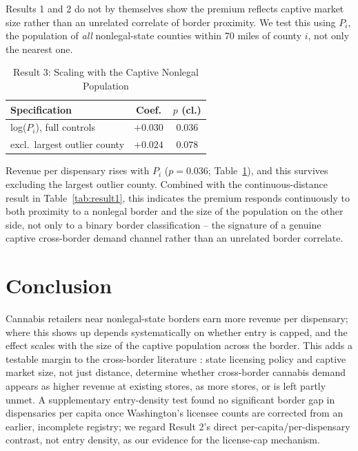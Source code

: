 \documentclass[5p]{elsarticle}
\begin{document}
Results 1 and 2 do not by themselves show the premium reflects captive market size rather than an unrelated
correlate of border proximity. We test this using $P_i$, the population of \emph{all} nonlegal-state counties
within 70 miles of county $i$, not only the nearest one.

\begin{table}[h]
\centering
\caption{Result 3: Scaling with the Captive Nonlegal Population}
\label{tab:result3}
\small
\begin{tabular}{lcc}
\toprule
Specification & Coef. & $p$ (cl.) \\
\midrule
log($P_i$), full controls & $+0.030$ & $0.036$ \\
\quad excl.\ largest outlier county & $+0.024$ & $0.078$ \\
\bottomrule
\end{tabular}
\end{table}

Revenue per dispensary rises with $P_i$ ($p=0.036$; Table~\ref{tab:result3}), and this survives excluding the
largest outlier county. Combined with the continuous-distance result in Table~\ref{tab:result1}, this
indicates the premium responds continuously to both proximity to a nonlegal border and the size of the
population on the other side, not only to a binary border classification -- the signature of a genuine
captive cross-border demand channel rather than an unrelated border correlate.

\section{Conclusion}

Cannabis retailers near nonlegal-state borders earn more revenue per dispensary; where this shows up depends
systematically on whether entry is capped, and the effect scales with the size of the captive population
across the border. This adds a testable margin to the cross-border literature
\citep{HansenMillerWeber2020,HaoCowan2020}: state licensing policy and captive market size, not just distance,
determine whether cross-border cannabis demand appears as higher revenue at existing stores, as more stores,
or is left partly unmet. A supplementary entry-density test found no significant border gap in dispensaries
per capita once Washington's licensee counts are corrected from an earlier, incomplete registry; we regard
Result 2's direct per-capita/per-dispensary contrast, not entry density, as our evidence for the license-cap
mechanism.



\end{document}
